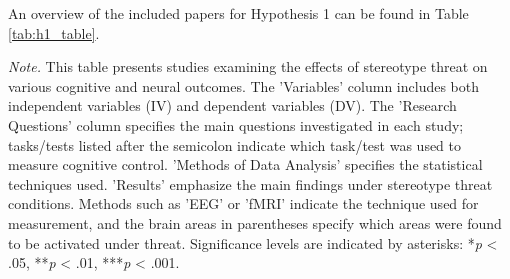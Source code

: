 \documentclass[
  stu, a4paper,floatsintext]{apa7}
\newenvironment{lltable}{\begin{landscape}\centering\begin{ThreePartTable}}{\end{ThreePartTable}\end{landscape}}
\begin{document}
An overview of the included papers for Hypothesis 1 can be found in Table \ref{tab:h1_table}.

\begin{lltable}

\begin{TableNotes}[para]
\normalsize{\textit{Note.} This table presents studies examining the effects of stereotype threat on various cognitive and neural outcomes. The 'Variables' column includes both independent variables (IV) and dependent variables (DV). The 'Research Questions' column specifies the main questions investigated in each study; tasks/tests listed after the semicolon indicate which task/test was used to measure cognitive control. 'Methods of Data Analysis' specifies the statistical techniques used. 'Results' emphasize the main findings under stereotype threat conditions. Methods such as 'EEG' or 'fMRI' indicate the technique used for measurement, and the brain areas in parentheses specify which areas were found to be activated under threat. Significance levels are indicated by asterisks: *\textit{p} < .05, **\textit{p} < .01, ***\textit{p} < .001.}
\end{TableNotes}

\small{

}
\end{lltable}
\end{document}
